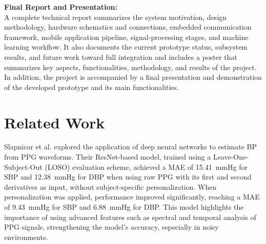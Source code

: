 \textbf{Final Report and Presentation:}\\ 
A complete technical report summarizes the system motivation, design methodology, hardware schematics and connections, embedded communication framework, mobile application pipeline, signal-processing stages, and machine learning workflow. It also documents the current prototype status, subsystem results, and future work toward full integration and includes a poster that summarizes key aspects, functionalities, methodology, and results of the project. In addition, the project is accompanied by a final presentation and demonstration of the developed prototype and its main functionalities.\\

\section{Related Work}


Slapnicar et al. \cite{Slapnicar2019} explored the application of deep neural networks to estimate BP from PPG waveforms. Their ResNet-based model, trained using a Leave-One-Subject-Out (LOSO) evaluation scheme, achieved a MAE of 15.41~mmHg for SBP and 12.38~mmHg for DBP when using raw PPG with its first and second derivatives as input, without subject-specific personalization. When personalization was applied, performance improved significantly, reaching a MAE of 9.43~mmHg for SBP and 6.88~mmHg for DBP. This model highlights the importance of using advanced features such as spectral and temporal analysis of PPG signals, strengthening the model's accuracy, especially in noisy environments.\\